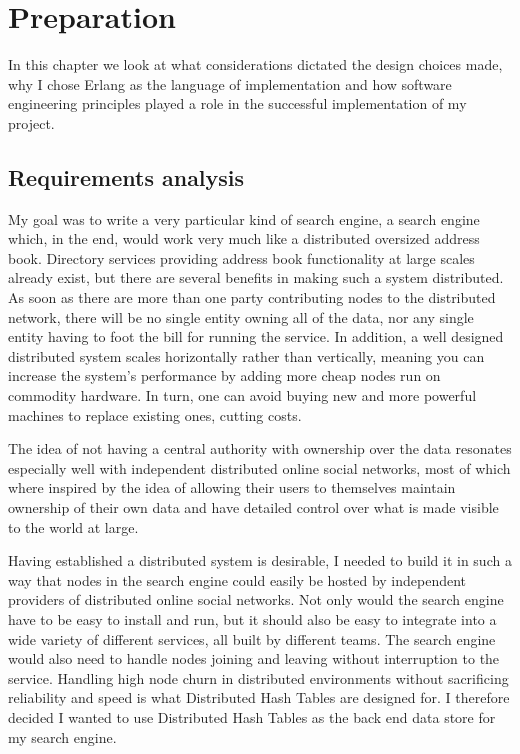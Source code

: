 

\chapter{Preparation}
In this chapter we look at what considerations dictated the design choices made, why I chose Erlang as the language of implementation and how software engineering principles played a role in the successful implementation of my project.

\section{Requirements analysis}
My goal was to write a very particular kind of search engine, a search engine which, in the end, would work very much like a distributed oversized address book.
Directory services providing address book functionality at large scales already exist, but there are several benefits in making such a system distributed. As soon as there are more than one party contributing nodes to the distributed network, there will be no single entity owning all of the data, nor any single entity having to foot the bill for running the service. In addition, a well designed distributed system scales horizontally rather than vertically, meaning you can increase the system's performance by adding more cheap nodes run on commodity hardware. In turn, one can avoid buying new and more powerful machines to replace existing ones, cutting costs.

The idea of not having a central authority with ownership over the data resonates especially well with independent distributed online social networks, most of which where inspired by the idea of allowing their users to themselves maintain ownership of their own data and have detailed control over what is made visible to the world at large.

Having established a distributed system is desirable, I needed to build it in such a way that nodes in the search engine could easily be hosted by independent providers of distributed online social networks. Not only would the search engine have to be easy to install and run, but it should also be easy to integrate into a wide variety of different services, all built by different teams. The search engine would also need to handle nodes joining and leaving without interruption to the service.
Handling high node churn in distributed environments without sacrificing reliability and speed is what Distributed Hash Tables are designed for. I therefore decided I wanted to use Distributed Hash Tables as the back end data store for my search engine.


